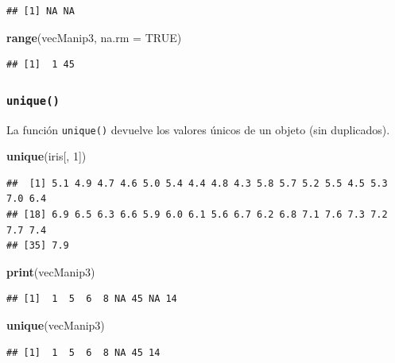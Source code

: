 \documentclass[]{book}
\newenvironment{Shaded}{\begin{snugshade}}{\end{snugshade}}
\newcommand{\KeywordTok}[1]{\textcolor[rgb]{0.13,0.29,0.53}{\textbf{#1}}}
\newcommand{\DataTypeTok}[1]{\textcolor[rgb]{0.13,0.29,0.53}{#1}}
\newcommand{\DecValTok}[1]{\textcolor[rgb]{0.00,0.00,0.81}{#1}}
\newcommand{\OtherTok}[1]{\textcolor[rgb]{0.56,0.35,0.01}{#1}}
\newcommand{\NormalTok}[1]{#1}
\begin{document}
\begin{verbatim}
## [1] NA NA
\end{verbatim}

\begin{Shaded}
\begin{Highlighting}[]
\KeywordTok{range}\NormalTok{(vecManip3, }\DataTypeTok{na.rm =} \OtherTok{TRUE}\NormalTok{)}
\end{Highlighting}
\end{Shaded}

\begin{verbatim}
## [1]  1 45
\end{verbatim}

\subsubsection{\texorpdfstring{\texttt{unique()}}{unique()}}\label{l015unique}

La función \texttt{unique()} devuelve los valores únicos de un objeto
(sin duplicados).

\begin{Shaded}
\begin{Highlighting}[]
\KeywordTok{unique}\NormalTok{(iris[, }\DecValTok{1}\NormalTok{])}
\end{Highlighting}
\end{Shaded}

\begin{verbatim}
##  [1] 5.1 4.9 4.7 4.6 5.0 5.4 4.4 4.8 4.3 5.8 5.7 5.2 5.5 4.5 5.3 7.0 6.4
## [18] 6.9 6.5 6.3 6.6 5.9 6.0 6.1 5.6 6.7 6.2 6.8 7.1 7.6 7.3 7.2 7.7 7.4
## [35] 7.9
\end{verbatim}

\begin{Shaded}
\begin{Highlighting}[]
\KeywordTok{print}\NormalTok{(vecManip3)}
\end{Highlighting}
\end{Shaded}

\begin{verbatim}
## [1]  1  5  6  8 NA 45 NA 14
\end{verbatim}

\begin{Shaded}
\begin{Highlighting}[]
\KeywordTok{unique}\NormalTok{(vecManip3)}
\end{Highlighting}
\end{Shaded}

\begin{verbatim}
## [1]  1  5  6  8 NA 45 14
\end{verbatim}
\end{document}
